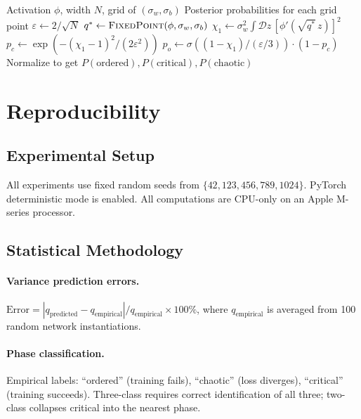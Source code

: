 \documentclass[10pt]{article}
\begin{document}
\begin{algorithm}[h]
\caption{Soft Phase Classification}
\label{alg:phase-diagram}
\begin{algorithmic}[1]
\Require Activation $\phi$, width $N$, grid of $(\sigma_w, \sigma_b)$
\Ensure Posterior probabilities for each grid point
\State $\varepsilon \gets 2 / \sqrt{N}$
    \State $q^* \gets \textsc{FixedPoint}(\phi, \sigma_w, \sigma_b)$
    \State $\chi_1 \gets \sigma_w^2 \int \mathcal{D}z\, [\phi'(\sqrt{q^*}\, z)]^2$
    \State $p_c \gets \exp(-(\chi_1 - 1)^2/(2\varepsilon^2))$
    \State $p_o \gets \sigma((1 - \chi_1)/(\varepsilon/3)) \cdot (1 - p_c)$
    \State Normalize to get $P(\text{ordered}), P(\text{critical}), P(\text{chaotic})$
\EndFor
\end{algorithmic}
\end{algorithm}

\section{Reproducibility}
\label{app:reproducibility}

\subsection{Experimental Setup}

All experiments use fixed random seeds from $\{42, 123, 456, 789, 1024\}$.
PyTorch deterministic mode is enabled.
All computations are CPU-only on an Apple M-series processor.

\subsection{Statistical Methodology}

\paragraph{Variance prediction errors.}
$\text{Error} = |q_{\text{predicted}} - q_{\text{empirical}}| / q_{\text{empirical}} \times 100\%$,
where $q_{\text{empirical}}$ is averaged from 100 random network instantiations.

\paragraph{Phase classification.}
Empirical labels: ``ordered'' (training fails), ``chaotic'' (loss diverges), ``critical'' (training succeeds).
Three-class requires correct identification of all three; two-class collapses critical into the nearest phase.
\end{document}

